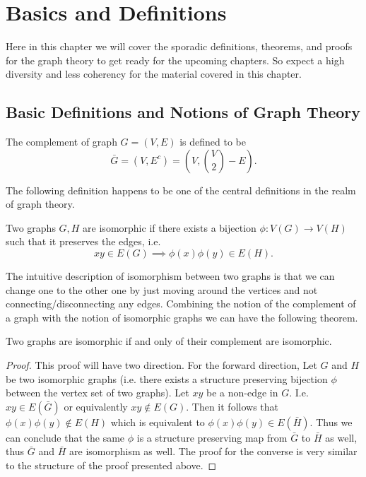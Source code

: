 \chapter{Basics and Definitions}
Here in this chapter we will cover the sporadic definitions, theorems, and proofs for the graph theory to get ready for the upcoming chapters. So expect a high diversity and less coherency for the material covered in this chapter. 


\section{Basic Definitions and Notions of Graph Theory}

\begin{definition}
	The complement of graph $G=(V,E)$ is defined to be
	\[ \bar{G} = (V,E^c) = (V,\binom{V}{2} - E). \]
\end{definition}

The following definition happens to be one of the central definitions in the realm of graph theory.
\begin{definition}
	Two graphs $G,H$ are isomorphic if there exists a bijection $\phi: V(G) \to V(H)$ such that it preserves the edges, i.e.
	\[ xy \in E(G) \implies \phi(x)\phi(y) \in E(H). \]
\end{definition}
The intuitive description of isomorphism between two graphs is that we can change one to the other one by just moving around the vertices and not connecting/disconnecting any edges. Combining the notion of the complement of a graph with the notion of isomorphic graphs we can have the following theorem.

\begin{theorem}
	Two graphs are isomorphic if and only of their complement are isomorphic.
\end{theorem} 
\begin{proof}
	This proof will have two direction. For the forward direction, Let $G$ and $H$ be two isomorphic graphs (i.e. there exists a structure preserving bijection $\phi$ between the vertex set of two graphs). Let $xy$ be a non-edge in $G$. I.e. $xy \in E(\bar{G})$ or equivalently $xy \notin E(G)$. Then it follows that $\phi(x)\phi(y) \notin E(H)$ which is equivalent to $\phi(x)\phi(y) \in E(\bar{H})$. Thus we can conclude that the same $\phi$ is a structure preserving map from $\bar{G}$ to $\bar{H}$ as well, thus $\bar{G}$ and $\bar{H}$ are isomorphism as well. The proof for the converse is very similar to the structure of the proof presented above.
\end{proof}